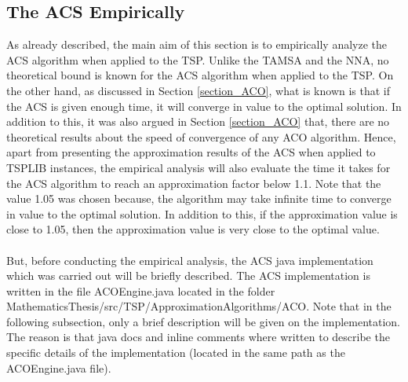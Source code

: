 \documentclass{article}
\begin{document}
\subsection{The ACS Empirically}
As already described, the main aim of this section is to empirically analyze the ACS algorithm when applied to the TSP. Unlike the TAMSA and the NNA, no theoretical bound is known for the ACS algorithm when applied to the TSP. On the other hand, as discussed in Section \ref{section_ACO}, what is known is that if the ACS is given enough time, it will converge in value to the optimal solution. In addition to this, it was also argued in Section \ref{section_ACO} that, there are no theoretical results about the speed of convergence of any ACO algorithm. Hence, apart from presenting the approximation results of the ACS when applied to TSPLIB instances, the empirical analysis will also evaluate the time it takes for the ACS algorithm to reach an approximation factor below 1.1. Note that the value 1.05 was chosen because, the algorithm may take infinite time to converge in value to the optimal solution. In addition to this, if the approximation value is close to 1.05, then the approximation value is very close to the optimal value.\\\\
But, before conducting the empirical analysis, the ACS java implementation which was carried out will be briefly described. The ACS implementation is written in the file ACOEngine.java located in the folder MathematicsThesis/src/TSP/ApproximationAlgorithms/ACO. Note that in the following subsection, only a brief description will be given on the implementation. The reason is that java docs and inline comments where written to describe the specific details of the implementation (located in the same path as the ACOEngine.java file).
\end{document}
